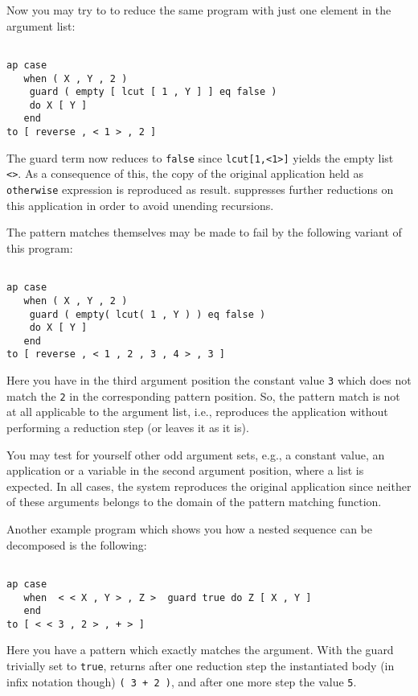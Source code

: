 Now you may try to to reduce the same program with just one element in the argument
list:
\begin{verbatim}

ap case 
   when ( X , Y , 2 )
    guard ( empty [ lcut [ 1 , Y ] ] eq false )
    do X [ Y ]
   end
to [ reverse , < 1 > , 2 ]

\end{verbatim}
The guard term now reduces to {\tt false} since {\tt lcut[1,<1>]}
yields the empty list {\tt <>}. As a consequence of this, the copy of the original application
held as {\tt otherwise} expression is reproduced as result. \pired suppresses further reductions
on this application in order to avoid unending recursions.

The pattern matches themselves may be made to fail by the following variant of this program:
\begin{verbatim}

ap case 
   when ( X , Y , 2 )
    guard ( empty( lcut( 1 , Y ) ) eq false )
    do X [ Y ]
   end
to [ reverse , < 1 , 2 , 3 , 4 > , 3 ]

\end{verbatim}
Here you have in the third argument position the constant value {\tt 3} which does not
match the {\tt 2} in the corresponding pattern position. So, the pattern match is not at all
applicable to the argument list, i.e., \pired reproduces the application without performing
a reduction step (or leaves it as it is). 

You may test for yourself other odd argument sets, e.g., a constant value,
an application or a variable in the second argument position, where 
a list is expected. In all cases, the system reproduces the original application
since neither of these arguments belongs to the domain of the pattern matching function.

Another example program which shows you how a nested sequence can be decomposed
is the following:
\begin{verbatim}

ap case 
   when  < < X , Y > , Z >  guard true do Z [ X , Y ]
   end
to [ < < 3 , 2 > , + > ]

\end{verbatim}
Here you have a pattern which exactly matches the argument. With the guard trivially set to
{\tt true}, \pired returns after one reduction step the instantiated body (in infix notation 
though) {\tt ( 3 + 2 )}, and after one more step the value {\tt 5}.

